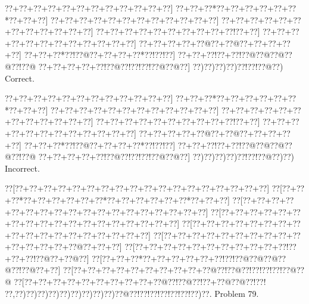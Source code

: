 \documentclass[a5paper]{article}
\begin{document}
\begin{center}
{\goo
\0??+\0??+\0??+\0??+\0??+\0??+\0??+\0??+\0??+\0??+\0??+\0??]
\0??+\0??+\0??*\0??+\0??+\0??+\0??+\0??+\0??*\0??+\0??+\0??]
\0??+\0??+\0??+\0??+\0??+\0??+\0??+\0??+\0??+\0??+\0??+\0??]
\0??+\0??+\0??+\0??+\0??+\0??+\0??+\0??+\0??+\0??+\0??+\0??]
\0??+\0??+\0??+\0??+\0??+\0??+\0??+\0??+\0??+\0??!\0??+\0??]
\0??+\0??+\0??+\0??+\0??+\0??+\0??+\0??+\0??+\0??+\0??+\0??]
\0??+\0??+\0??+\0??+\0??@\0??+\0??@\0??+\0??+\0??+\0??+\0??]
\0??+\0??+\0??*\0??!\0??@\0??+\0??+\0??+\0??*\0??!\0??!\0??]
\0??+\0??+\0??!\0??+\0??!\0??@\0??@\0??@\0??@\0??!\0??@
\0??+\0??+\0??+\0??+\0??!\0??@\0??!\0??!\0??!\0??@\0??@\0??]
\0??)\0??)\0??)\0??)\0??!\0??!\0??@\0??)
}
Correct. 

\end{center}
\begin{center}
{\goo
\0??+\0??+\0??+\0??+\0??+\0??+\0??+\0??+\0??+\0??+\0??+\0??]
\0??+\0??+\0??*\0??+\0??+\0??+\0??+\0??+\0??*\0??+\0??+\0??]
\0??+\0??+\0??+\0??+\0??+\0??+\0??+\0??+\0??+\0??+\0??+\0??]
\0??+\0??+\0??+\0??+\0??+\0??+\0??+\0??+\0??+\0??+\0??+\0??]
\0??+\0??+\0??+\0??+\0??+\0??+\0??+\0??+\0??+\0??!\0??+\0??]
\0??+\0??+\0??+\0??+\0??+\0??+\0??+\0??+\0??+\0??+\0??+\0??]
\0??+\0??+\0??+\0??+\0??@\0??+\0??@\0??+\0??+\0??+\0??+\0??]
\0??+\0??+\0??*\0??!\0??@\0??+\0??+\0??+\0??*\0??!\0??!\0??]
\0??+\0??+\0??!\0??+\0??!\0??@\0??@\0??@\0??@\0??!\0??@
\0??+\0??+\0??+\0??+\0??!\0??@\0??!\0??!\0??!\0??@\0??@\0??]
\0??)\0??)\0??)\0??)\0??!\0??!\0??@\0??)\0??)
}
Incorrect. 

\end{center}
\newpage
\begin{center}
{\goo
\0??[\0??+\0??+\0??+\0??+\0??+\0??+\0??+\0??+\0??+\0??+\0??+\0??+\0??+\0??+\0??+\0??+\0??+\0??]
\0??[\0??+\0??+\0??*\0??+\0??+\0??+\0??+\0??+\0??*\0??+\0??+\0??+\0??+\0??+\0??*\0??+\0??+\0??]
\0??[\0??+\0??+\0??+\0??+\0??+\0??+\0??+\0??+\0??+\0??+\0??+\0??+\0??+\0??+\0??+\0??+\0??+\0??]
\0??[\0??+\0??+\0??+\0??+\0??+\0??+\0??+\0??+\0??+\0??+\0??+\0??+\0??+\0??+\0??+\0??+\0??+\0??]
\0??[\0??+\0??+\0??+\0??+\0??+\0??+\0??+\0??+\0??+\0??+\0??+\0??+\0??+\0??+\0??+\0??+\0??+\0??]
\0??[\0??+\0??+\0??+\0??+\0??+\0??+\0??+\0??+\0??+\0??+\0??+\0??+\0??+\0??+\0??@\0??+\0??+\0??]
\0??[\0??+\0??+\0??+\0??+\0??+\0??+\0??+\0??+\0??+\0??+\0??!\0??+\0??+\0??!\0??@\0??+\0??@\0??]
\0??[\0??+\0??+\0??*\0??+\0??+\0??+\0??+\0??+\0??!\0??!\0??@\0??@\0??@\0??@\0??!\0??@\0??+\0??]
\0??[\0??+\0??+\0??+\0??+\0??+\0??+\0??+\0??+\0??+\0??@\0??!\0??@\0??!\0??!\0??!\0??!\0??@\0??@
\0??[\0??+\0??+\0??+\0??+\0??+\0??+\0??+\0??+\0??+\0??@\0??!\0??@\0??!\0??+\0??@\0??@\0??!\0??!
\0??,\0??)\0??)\0??)\0??)\0??)\0??)\0??)\0??)\0??)\0??@\0??!\0??!\0??!\0??!\0??!\0??!\0??)\0??.
}
Problem 79.

\end{center}
\end{document}
